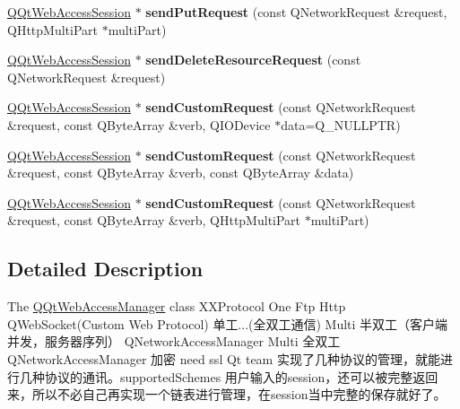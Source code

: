 \begin{DoxyCompactItemize}
\mbox{\hyperlink{class_q_qt_web_access_session}{Q\+Qt\+Web\+Access\+Session}} $\ast$ {\bfseries send\+Put\+Request} (const Q\+Network\+Request \&request, Q\+Http\+Multi\+Part $\ast$multi\+Part)
\item 
\mbox{\label{class_q_qt_web_access_manager_a8fa2d0e0288f0f738fefe9ce1d0b8035}} 
\mbox{\hyperlink{class_q_qt_web_access_session}{Q\+Qt\+Web\+Access\+Session}} $\ast$ {\bfseries send\+Delete\+Resource\+Request} (const Q\+Network\+Request \&request)
\item 
\mbox{\label{class_q_qt_web_access_manager_abc271c2a13c65e0c04ca640816c2da4c}} 
\mbox{\hyperlink{class_q_qt_web_access_session}{Q\+Qt\+Web\+Access\+Session}} $\ast$ {\bfseries send\+Custom\+Request} (const Q\+Network\+Request \&request, const Q\+Byte\+Array \&verb, Q\+I\+O\+Device $\ast$data=Q\+\_\+\+N\+U\+L\+L\+P\+TR)
\item 
\mbox{\label{class_q_qt_web_access_manager_a9eb26e92f10180fe710a13d88665f26c}} 
\mbox{\hyperlink{class_q_qt_web_access_session}{Q\+Qt\+Web\+Access\+Session}} $\ast$ {\bfseries send\+Custom\+Request} (const Q\+Network\+Request \&request, const Q\+Byte\+Array \&verb, const Q\+Byte\+Array \&data)
\item 
\mbox{\label{class_q_qt_web_access_manager_aae1337d9479bfd0d1cdd5e4008e46990}} 
\mbox{\hyperlink{class_q_qt_web_access_session}{Q\+Qt\+Web\+Access\+Session}} $\ast$ {\bfseries send\+Custom\+Request} (const Q\+Network\+Request \&request, const Q\+Byte\+Array \&verb, Q\+Http\+Multi\+Part $\ast$multi\+Part)
\end{DoxyCompactItemize}


\subsection{Detailed Description}
The \mbox{\hyperlink{class_q_qt_web_access_manager}{Q\+Qt\+Web\+Access\+Manager}} class X\+X\+Protocol One Ftp Http Q\+Web\+Socket(\+Custom Web Protocol) 单工...(全双工通信) Multi 半双工（客户端并发，服务器序列） Q\+Network\+Access\+Manager Multi 全双工 Q\+Network\+Access\+Manager 加密 need ssl Qt team 实现了几种协议的管理，就能进行几种协议的通讯。supported\+Schemes 用户输入的session，还可以被完整返回来，所以不必自己再实现一个链表进行管理，在session当中完整的保存就好了。 

